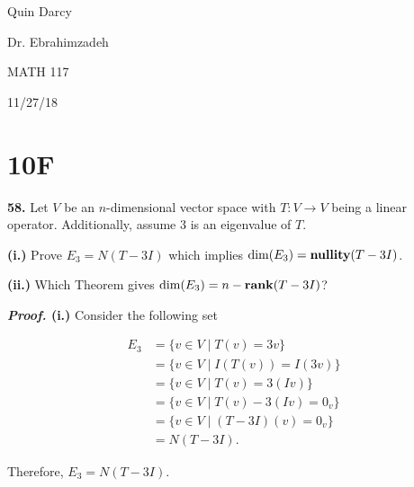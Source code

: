 \documentclass[12pt, a4paper]{article}
\begin{document}
\begin{flushleft}
  
    Quin Darcy\par
    Dr. Ebrahimzadeh\par
    MATH 117\par
    11/27/18
  
\end{flushleft}
  
\centerline{}
 
\vspace{4mm}
 
\section{10F}
 
\vspace{4mm}

\noindent\textbf{58.} Let $V$ be an $n$-dimensional vector space with $T\colon V\rightarrow V$ being a linear operator. Additionally, assume $3$ is an eigenvalue of $T$.

\begin{description}
    \item\textbf{(i.) } Prove $E_3=N(T-3I)$ which implies $\dim(E_3)=\text{\textbf{nullity}}(T-3I)$.
    \item\textbf{(ii.)} Which Theorem gives $\dim(E_3)=n-\text{\textbf{rank}}(T-3I)$?
\end{description}

\vspace{4mm}

\textbf{\textit{Proof.} (i.)} Consider the following set 

\begin{equation*}
    \begin{split}
    E_3 &= \{v\in V\mid T(v)=3v\} \\
    &= \{v\in V\mid I(T(v))=I(3v)\} \\
    &= \{v\in V\mid T(v)=3(Iv)\} \\
    &= \{v\in V\mid T(v)-3(Iv)=0_v\} \\
    &= \{v\in V\mid (T-3I)(v)=0_v\} \\
    &= N(T-3I).
    \end{split}
\end{equation*}

\vspace{2mm}

\noindent Therefore, $E_3=N(T-3I)$. \square
\end{document}
